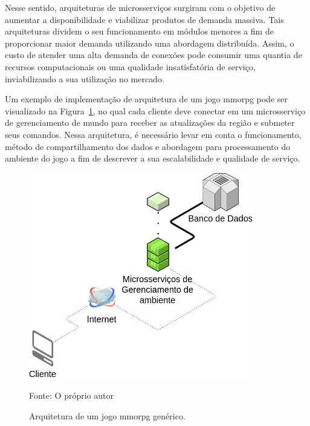 Nesse sentido, arquiteturas de microsserviços surgiram com o objetivo de aumentar a disponibilidade e viabilizar produtos de demanda massiva.
%
Tais arquiteturas dividem o seu funcionamento em módulos menores a fim de proporcionar maior demanda utilizando uma abordagem distribuída.
%
Assim, o custo de atender uma alta demanda de conexões pode consumir uma quantia de recursos computacionais ou uma qualidade insatisfatória de serviço, inviabilizando a sua utilização no mercado.



Um exemplo de implementação de arquitetura de um jogo \ac{mmorpg} pode ser visualizado na Figura~\ref{fig:generica}, no qual cada cliente deve conectar em um microsserviço de gerenciamento de mundo para receber as atualizações da região e submeter seus comandos.
%
Nessa arquitetura, é necessário levar em conta o funcionamento, método de compartilhamento dos dados e abordagem para processamento do ambiente do jogo a fim de descrever a sua escalabilidade e qualidade de serviço.


\begin{figure}[htb!]
\caption{Arquitetura de um jogo \ac{mmorpg} genérico.}
\label{fig:generica}
\includegraphics[height=9.0cm]{img/cap3/generica.png}
\centering

Fonte: O próprio autor
\end{figure}

